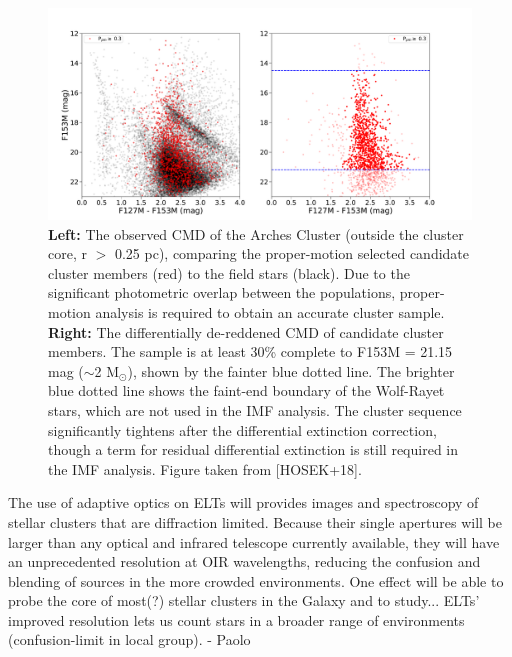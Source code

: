 \documentclass[11pt]{article}
\begin{document}
\begin{figure}
    \centering
    \includegraphics[scale=0.3]{f7.pdf}
    \caption{{\bf Left:} The observed CMD of the Arches Cluster (outside the cluster core, r $>$ 0.25 pc), comparing the proper-motion selected candidate cluster members (red) to the field stars (black). Due to the significant photometric overlap between the populations, proper-motion analysis is required to obtain an accurate cluster sample. {\bf Right:} The differentially de-reddened CMD of candidate cluster members. The sample is at least 30\% complete to F153M = 21.15 mag ($\sim$2 M$_{\odot}$), shown by the fainter blue dotted line. The brighter blue dotted line shows the faint-end boundary of the Wolf-Rayet stars, which are not used in the IMF analysis. The cluster sequence significantly tightens after the differential extinction correction, though a term for residual differential extinction is still required in the IMF analysis.
    Figure taken from [HOSEK+18].}
    \label{fig:Arches_cmd}
\end{figure}

The use of adaptive optics on ELTs will provides images and spectroscopy of stellar clusters that are diffraction limited. Because their single apertures will be larger than any optical and infrared telescope currently available, they will have an unprecedented resolution at OIR wavelengths, reducing the confusion and blending of sources in the more crowded environments. One effect will be able to probe the core of most(?) stellar clusters in the Galaxy and to study...        ELTs’ improved resolution lets us count stars in a broader range of environments (confusion-limit in local group). - Paolo
\end{document}
